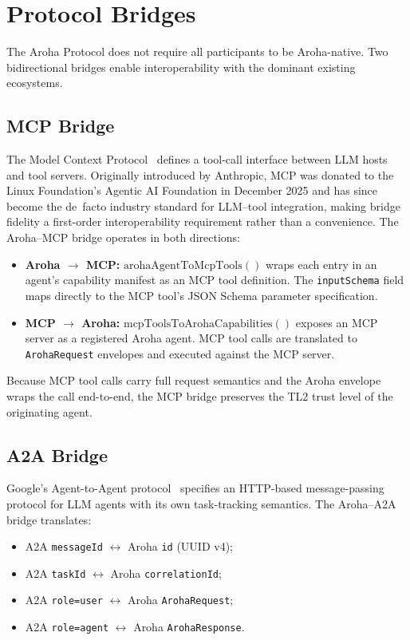 \documentclass[conference]{IEEEtran}
\begin{document}
\section{Protocol Bridges}
\label{sec:bridges}

The Aroha Protocol does not require all participants to be
Aroha-native. Two bidirectional bridges enable interoperability
with the dominant existing ecosystems.

\subsection{MCP Bridge}

The Model Context Protocol~\cite{anthropic2024mcp} defines a
tool-call interface between LLM hosts and tool servers.
Originally introduced by Anthropic, MCP was donated to the
Linux Foundation's Agentic AI Foundation in December 2025 and
has since become the de~facto industry standard for
LLM--tool integration, making bridge fidelity a first-order
interoperability requirement rather than a convenience.
The Aroha--MCP bridge operates in both directions:
\begin{itemize}
  \item \textbf{Aroha $\to$ MCP:}
    $\mathrm{arohaAgentToMcpTools}()$ wraps each entry in an
    agent's capability manifest as an MCP tool definition.
    The \texttt{inputSchema} field maps directly to the MCP
    tool's JSON Schema parameter specification.
  \item \textbf{MCP $\to$ Aroha:}
    $\mathrm{mcpToolsToArohaCapabilities}()$ exposes an MCP
    server as a registered Aroha agent. MCP tool calls are
    translated to \texttt{ArohaRequest} envelopes and executed
    against the MCP server.
\end{itemize}

Because MCP tool calls carry full request semantics and the
Aroha envelope wraps the call end-to-end, the MCP bridge
preserves the TL2 trust level of the originating agent.

\subsection{A2A Bridge}

Google's Agent-to-Agent protocol~\cite{google2024a2a} specifies
an HTTP-based message-passing protocol for LLM agents with its
own task-tracking semantics. The Aroha--A2A bridge translates:
\begin{itemize}
  \item A2A \texttt{messageId} $\leftrightarrow$ Aroha
    \texttt{id} (UUID v4);
  \item A2A \texttt{taskId} $\leftrightarrow$ Aroha
    \texttt{correlationId};
  \item A2A \texttt{role=user} $\leftrightarrow$ Aroha
    \texttt{ArohaRequest};
  \item A2A \texttt{role=agent} $\leftrightarrow$ Aroha
    \texttt{ArohaResponse}.
\end{itemize}
\end{document}
